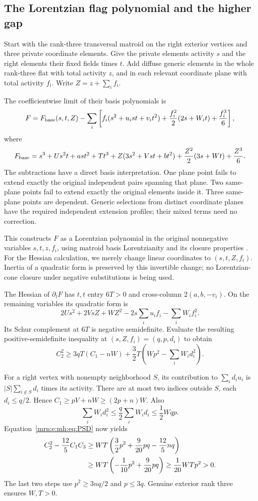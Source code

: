 \documentclass[11pt,a4paper]{article}
\theoremstyle{remark}\newtheorem{remark}[theorem]{Remark}
\begin{document}
\subsection{The Lorentzian flag polynomial and the higher gap}
Start with the rank-three transversal matroid on the right exterior vertices and three private coordinate elements. Give the private elements activity $s$ and the right elements their fixed fields times $t$. Add diffuse generic elements in the whole rank-three flat with total activity $z$, and in each relevant coordinate plane with total activity $f_i$. Write $Z=z+\sum_i f_i$.

The coefficientwise limit of their basis polynomials is
\begin{equation}\label{mrn:e:mh:eq:flag}
 F=F_{\rm base}(s,t,Z)
 -\sum_i\left[
 f_i(s^2+u_i st+v_i t^2)
 +\frac{f_i^2}{2}(2s+W_i t)+\frac{f_i^3}{6}
 \right],
\end{equation}
where
\[
 F_{\rm base}=s^3+Us^2t+ast^2+Tt^3
 +Z(3s^2+Vst+bt^2)+\frac{Z^2}{2}(3s+Wt)+\frac{Z^3}{6}.
\]
The subtractions have a direct basis interpretation. One plane point fails to extend exactly the original independent pairs spanning that plane. Two same-plane points fail to extend exactly the original elements inside it. Three same-plane points are dependent. Generic selections from distinct coordinate planes have the required independent extension profiles; their mixed terms need no correction.

This constructs $F$ as a Lorentzian polynomial in the original nonnegative variables $s,t,z,f_i$, using matroid basis Lorentzianity and its closure properties \cite{b:BH}. For the Hessian calculation, we merely change linear coordinates to $(s,t,Z,f_i)$. Inertia of a quadratic form is preserved by this invertible change; no Lorentzian-cone closure under negative substitutions is being used.

The Hessian of $\partial_tF$ has $t,t$ entry $6T>0$ and cross-column $2(a,b,-v_i)$. On the remaining variables its quadratic form is
\[
 2Us^2+2VsZ+WZ^2-2s\sum_i u_i f_i-\sum_iW_i f_i^2.
\]
Its Schur complement at $6T$ is negative semidefinite. Evaluate the resulting positive-semidefinite inequality at $(s,Z,f_i)=(q,p,d_i)$ to obtain
\begin{equation}\label{mrn:e:mh:eq:PSD}
 C_2^2\ge3qT(C_1-nW)+\frac32T\left(Wp^2-\sum_iW_i d_i^2\right).
\end{equation}

For a right vertex with nonempty neighborhood $S$, its contribution to $\sum_i d_i u_i$ is $|S|\sum_{i\notin S}d_i$ times its activity. There are at most two indices outside $S$, each $d_i\le q/2$. Hence $C_1\ge pV+nW\ge(2p+n)W$. Also
\[
 \sum_iW_i d_i^2\le\frac q2\sum_iW_i d_i\le\frac12Wqp.
\]
Equation~\eqref{mrn:e:mh:eq:PSD} now yields
\begin{align}
 C_2^2-\frac{12}{5}C_1C_3
 &\ge WT\left(\frac32p^2+\frac9{20}pq-\frac{12}{5}nq\right)\notag\\
 &\ge WT\left(-\frac1{10}p^2+\frac9{20}pq\right)
 \ge\frac1{20}WTp^2>0.\label{mrn:e:mh:eq:higher}
\end{align}
The last two steps use $p^2\ge3nq/2$ and $p\le3q$. Genuine exterior rank three ensures $W,T>0$.
\end{document}
